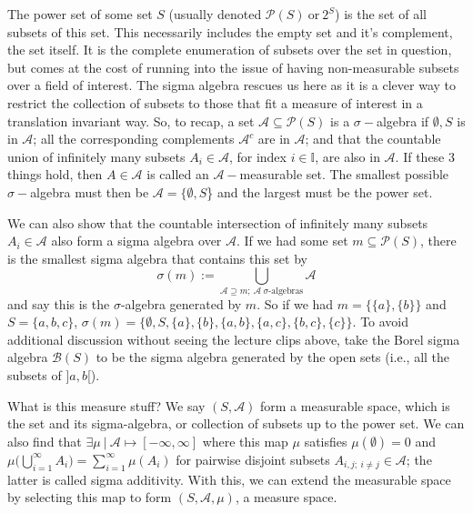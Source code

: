 \documentclass[titlepage]{book}
\begin{document}
\begin{flushleft}
    The power set of some set $S$  (usually denoted $\mathcal{P}(S)~\text{or}~2^{S}$) is the set of all subsets of this set. This
    necessarily includes the empty set and it's complement, the set itself. It is the complete enumeration of subsets over the set in question, but comes at the cost of running
    into the issue of having non-measurable subsets over a field of interest. The sigma algebra rescues us here as it is a clever way to restrict the collection of subsets to those that fit a measure of interest in a translation
    invariant way. So, to recap, a set $\mathcal{A} \subseteq \mathcal{P}(S)$ is a $\sigma-$algebra if $\emptyset, S$ is in $\mathcal{A}$; all the corresponding complements $\mathcal{A}^c$ are in $\mathcal{A}$; and that the countable union of infinitely many subsets $A_{i} \in \mathcal{A}$, for index $i \in \mathbb{I}$, are also in $\mathcal{A}$.
    If these 3 things hold, then $A \in \mathcal{A}$ is called an $\mathcal{A}-$measurable set. The smallest possible  $\sigma-$algebra must then be $\mathcal{A} = \{\emptyset, S$\} and the largest must be the power set.
\end{flushleft}
\begin{flushleft}
    We can also show that the countable intersection of infinitely many subsets $A_i \in \mathcal{A}$ also form a sigma algebra over $\mathcal{A}$. If we had some set $m \subseteq \mathcal{P}(S)$, there is the smallest sigma algebra that contains this set by $$\sigma(m) := \bigcup_{\mathcal{A} \supseteq m;~\mathcal{A}~\sigma\text{-algebras}}\mathcal{A} $$ and say this is the $\sigma$-algebra generated by $m$. So if we had $m = \{\{a\}, \{b\}\}$ and $S = \{a, b, c\}$, $\sigma(m) = \{\emptyset, S, \{a\}, \{b\},\{a, b\}, \{a, c\}, \{b, c\}, \{c\} \}$. To avoid additional discussion without seeing the lecture clips above, take the Borel sigma algebra $\mathcal{B}(S)$
    to be the sigma algebra generated by the open sets (i.e., all the subsets of ]$a,b$[).
\end{flushleft}
\begin{flushleft}
    What is this measure stuff? We say $(S, \mathcal{A})$ form a measurable space, which is the set and its sigma-algebra, or collection of subsets up to the power set. We can also find that $\exists \mu~|~\mathcal{A} \mapsto [-\infty, \infty]$ where this map $\mu$ satisfies $\mu(\emptyset) = 0$ and $\mu\bigl(\bigcup_{i = 1}^{\infty}A_i\bigr) = \sum_{i = 1}^{\infty}\mu(A_i)$ for pairwise disjoint subsets $A_{i, j;~i \neq j} \in \mathcal{A}$; the latter is called sigma additivity. With this, we can extend the measurable space by selecting this map to form $(S, \mathcal{A}, \mu)$, a measure space.
\end{flushleft}
\end{document}

